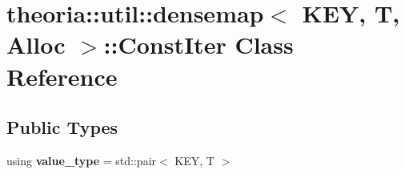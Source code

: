 \hypertarget{classtheoria_1_1util_1_1densemap_1_1ConstIter}{}\section{theoria\+:\+:util\+:\+:densemap$<$ K\+EY, T, Alloc $>$\+:\+:Const\+Iter Class Reference}
\label{classtheoria_1_1util_1_1densemap_1_1ConstIter}
\subsection*{Public Types}
\begin{DoxyCompactItemize}
\item 
\mbox{\label{classtheoria_1_1util_1_1densemap_1_1ConstIter_a061fb76ecf5498d6033472fa66635d4a}} 
using {\bfseries value\+\_\+type} = std\+::pair$<$ K\+EY, T $>$
\end{DoxyCompactItemize}
